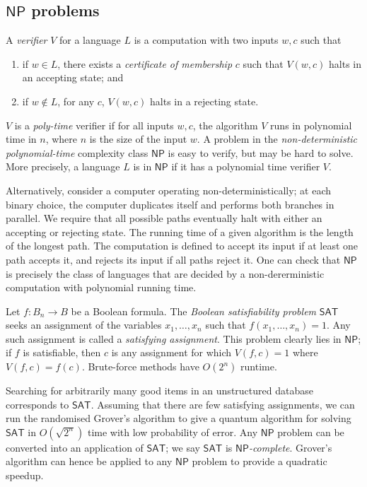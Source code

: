 \subsection{\texorpdfstring{\( \mathsf{NP} \)}{NP} problems}
A \emph{verifier} \( V \) for a language \( L \) is a computation with two inputs \( w, c \) such that
\begin{enumerate}
    \item if \( w \in L \), there exists a \emph{certificate of membership} \( c \) such that \( V(w,c) \) halts in an accepting state; and
    \item if \( w \not\in L \), for any \( c \), \( V(w,c) \) halts in a rejecting state.
\end{enumerate}
\( V \) is a \emph{poly-time} verifier if for all inputs \( w, c \), the algorithm \( V \) runs in polynomial time in \( n \), where \( n \) is the size of the input \( w \).
A problem in the \emph{non-deterministic polynomial-time} complexity class \( \mathsf{NP} \) is easy to verify, but may be hard to solve.
More precisely, a language \( L \) is in \( \mathsf{NP} \) if it has a polynomial time verifier \( V \).

Alternatively, consider a computer operating non-deterministically; at each binary choice, the computer duplicates itself and performs both branches in parallel.
We require that all possible paths eventually halt with either an accepting or rejecting state.
The running time of a given algorithm is the length of the longest path.
The computation is defined to accept its input if at least one path accepts it, and rejects its input if all paths reject it.
One can check that \( \mathsf{NP} \) is precisely the class of languages that are decided by a non-dererministic computation with polynomial running time.

Let \( f \colon B_n \to B \) be a Boolean formula.
The \emph{Boolean satisfiability problem} \( \mathsf{SAT} \) seeks an assignment of the variables \( x_1, \dots, x_n \) such that \( f(x_1, \dots, x_n) = 1 \).
Any such assignment is called a \emph{satisfying assignment}.
This problem clearly lies in \( \mathsf{NP} \); if \( f \) is satisfiable, then \( c \) is any assignment for which \( V(f,c) = 1 \) where \( V(f,c) = f(c) \).
Brute-force methods have \( O(2^n) \) runtime.

Searching for arbitrarily many good items in an unstructured database corresponds to \( \mathsf{SAT} \).
Assuming that there are few satisfying assignments, we can run the randomised Grover's algorithm to give a quantum algorithm for solving \( \mathsf{SAT} \) in \( O(\sqrt{2^n}) \) time with low probability of error.
Any \( \mathsf{NP} \) problem can be converted into an application of \( \mathsf{SAT} \); we say \( \mathsf{SAT} \) is \emph{\( \mathsf{NP} \)-complete}.
Grover's algorithm can hence be applied to any \( \mathsf{NP} \) problem to provide a quadratic speedup.

